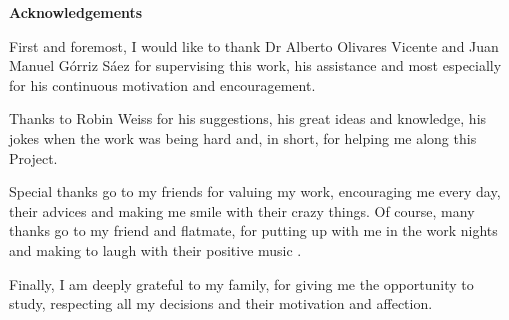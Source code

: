\begin{titlepage}
\label{ch:acknowledgements}
{ \huge \bfseries Acknowledgements \\[0.4cm] }


First and foremost, I would like to thank Dr Alberto Olivares Vicente and Juan Manuel Górriz Sáez for supervising this work, his assistance and most especially for his continuous motivation and encouragement.

Thanks to Robin Weiss for his suggestions, his great ideas and knowledge, his jokes when the work was being  hard and, in short, for helping me along this Project.

Special thanks go to my friends for valuing my work, encouraging me every day, their advices and making me smile with their crazy things. Of course, many thanks go to my friend and flatmate, for putting up with me in the work nights and making to laugh with their positive music .

Finally, I am deeply grateful to my family, for giving me the opportunity to study, respecting all my decisions and their motivation and affection.


\end{titlepage} 